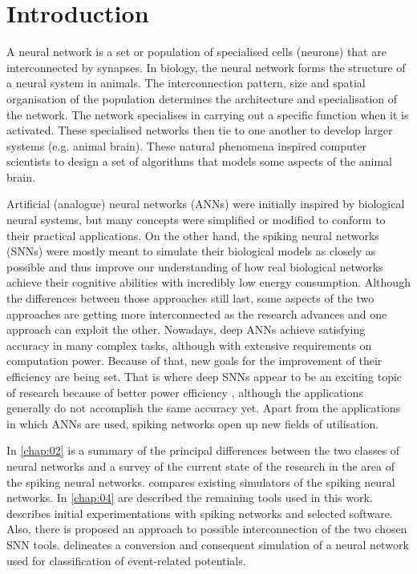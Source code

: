 \chapter{Introduction} \label{chap:01}

A neural network is a set or population of specialised cells (neurons) that are interconnected by synapses. In biology, the neural network forms the structure of a neural system in animals. The interconnection pattern, size and spatial organisation of the population determines the architecture and specialisation of the network. The network specialises in carrying out a specific function when it is activated. These specialised networks then tie to one another to develop larger systems (e.g. animal brain). These natural phenomena inspired computer scientists to design a set of algorithms that models some aspects of the animal brain.

Artificial (analogue) neural networks (ANNs) were initially inspired by biological neural systems, but many concepts were simplified or modified to conform to their practical applications. On the other hand, the spiking neural networks (SNNs) were mostly meant to simulate their biological models as closely as possible and thus improve our understanding of how real biological networks achieve their cognitive abilities with incredibly low energy consumption. Although the differences between those approaches still last, some aspects of the two approaches are getting more interconnected as the research advances and one approach can exploit the other. Nowadays, deep ANNs achieve satisfying accuracy in many complex tasks, although with extensive requirements on computation power. Because of that, new goals for the improvement of their efficiency are being set. That is where deep SNNs appear to be an exciting topic of research because of better power efficiency \cite{caoSpikingDeepConvolutional2015, tavanaeiDeepLearningSpiking2019}, although the applications generally do not accomplish the same accuracy yet. Apart from the applications in which ANNs are used, spiking networks open up new fields of utilisation. \par
In \cref{chap:02} is a summary of the principal differences between the two classes of neural networks and a survey of the current state of the research in the area of the spiking neural networks.  compares existing simulators of the spiking neural networks. In \cref{chap:04} are described the remaining tools used in this work.  describes initial experimentations with spiking networks and selected software. Also, there is proposed an approach to possible interconnection of the two chosen SNN tools.  delineates a conversion and consequent simulation of a neural network used for classification of event-related potentials.
